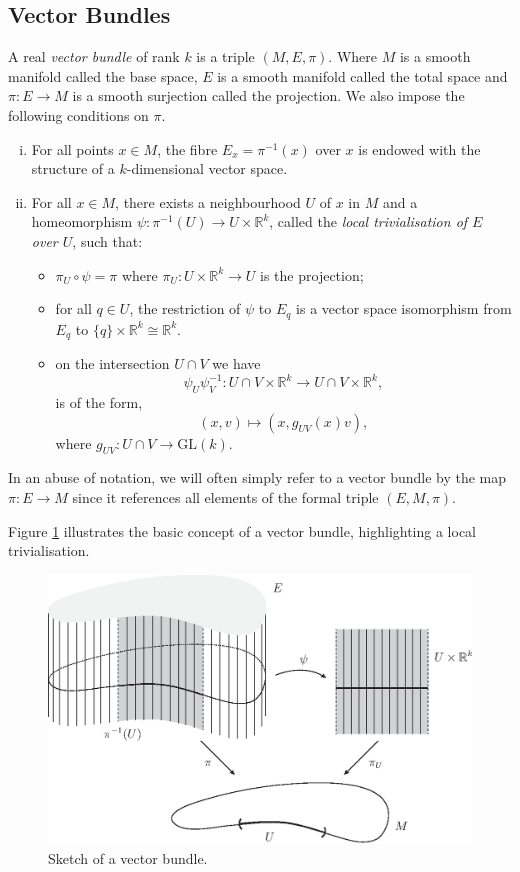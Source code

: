 \documentclass[12pt,a4paper]{article}
\begin{document}
\subsection{Vector Bundles}
\begin{definition}
A real \textit{vector bundle} of rank $k$ is a triple $(M,E,\pi)$. Where $M$ is a smooth manifold called the base space, $E$ is a smooth manifold called the total space and $\pi:E\to M$ is a smooth surjection called the projection. We also impose the following conditions on $\pi$.
\begin{enumerate}[(i)]
\item For all points $x\in M$, the fibre $E_x=\pi^{-1}(x)$ over $x$ is endowed with the structure of a $k$-dimensional vector space.
\item For all $x\in M$, there exists a neighbourhood $U$ of $x$ in $M$ and a homeomorphism $\psi:\pi^{-1}(U)\to U\times\mathbb{R}^k$, called the \textit{local trivialisation of $E$ over $U$}, such that:
\begin{itemize}
\item $\pi_U\circ\psi=\pi$ where $\pi_U:U\times\mathbb{R}^k\to U$ is the projection;
\item for all $q\in U$, the restriction of $\psi$ to $E_q$ is a vector space isomorphism from $E_q$ to $\{q\}\times\mathbb{R}^k\cong\mathbb{R}^k$.
\item on the intersection $U\cap V$ we have
\[
\psi_U\psi^{-1}_V:U\cap V\times\mathbb{R}^k\to U\cap V\times\mathbb{R}^k,
\]
is of the form,
\[
(x,v)\mapsto\left(x,g_{UV}(x)v\right),
\]
where $g_{UV}:U\cap V\to\mathrm{GL}(k)$.
\end{itemize}
\end{enumerate}
In an abuse of notation, we will often simply refer to a vector bundle by the map $\pi:E\to M$ since it references all elements of the formal triple $(E,M,\pi)$. 
\end{definition}

Figure \ref{fig:bundle-1} illustrates the basic concept of a vector bundle, highlighting a local trivialisation.

\begin{figure}[h!]
\centering
\includegraphics[scale=0.75]{fig/bundle-2b}
\caption{Sketch of a vector bundle.}
\label{fig:bundle-1}
\end{figure}
\end{document}
